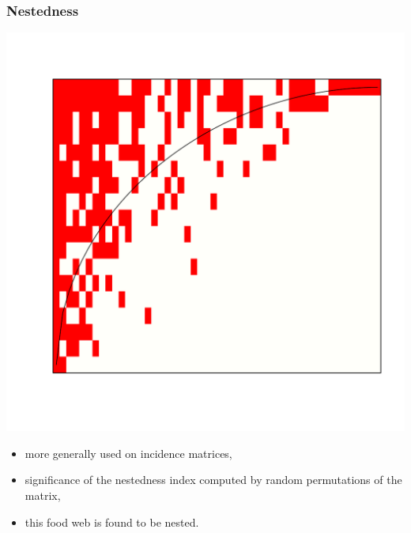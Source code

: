 \documentclass[compress,10pt]{beamer}
\begin{document}
\begin{frame}
 \frametitle{Nestedness}
 
 \begin{center}
  \includegraphics[scale=.3]{plots/chilean_nested.pdf}
 \end{center}


 \begin{itemize}
  \item more generally used on incidence matrices,
  \item significance of the nestedness index computed by random permutations of the matrix,
  \item this food web is found to be nested.
 
 \end{itemize}

 \end{frame}
\end{document}
